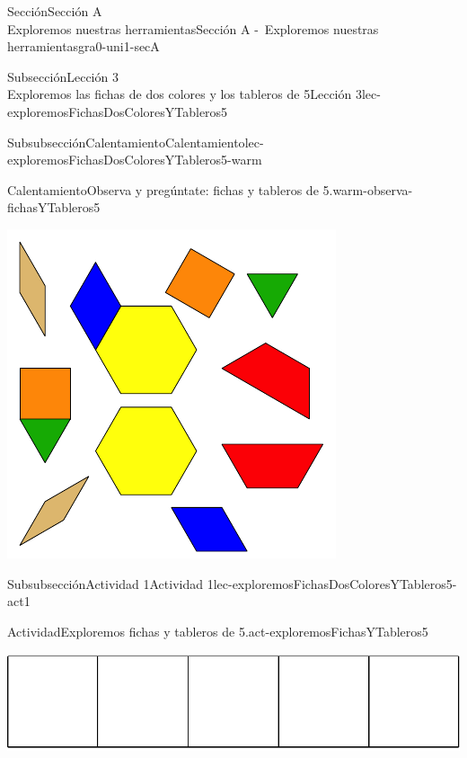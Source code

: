 \begin{sectionptx}{Sección}{{\Large Sección A\\}Exploremos nuestras herramientas}{}{Sección A -~Exploremos nuestras herramientas}{}{}{gra0-uni1-secA}
\begin{subsectionptx}{Subsección}{{\normalsize Lección 3\\[-0.05cm]}Exploremos las fichas de dos colores y los tableros de 5}{}{Lección 3}{}{}{lec-exploremosFichasDosColoresYTableros5}
\begin{subsubsectionptx}{Subsubsección}{Calentamiento}{}{Calentamiento}{}{}{lec-exploremosFichasDosColoresYTableros5-warm}
\begin{exploration}{Calentamiento}{Observa y pregúntate: fichas y tableros de 5.}{warm-observa-fichasYTableros5}
\begin{sidebyside}{2}{0.05}{0.05}{0.1}
\begin{sbspanel}{0.4}
\includegraphics[max width=\linewidth, center]{external/svg-source/tikz-file-147344.pdf}
\end{sbspanel}%
\end{sidebyside}%
\end{exploration}%
\end{subsubsectionptx}
%
%
\typeout{************************************************}
\typeout{************************************************}
%
\begin{subsubsectionptx}{Subsubsección}{Actividad 1}{}{Actividad 1}{}{}{lec-exploremosFichasDosColoresYTableros5-act1}
\begin{activity}{Actividad}{Exploremos fichas y tableros de 5.}{act-exploremosFichasYTableros5}%
\begin{image}{0}{1}{0}{}%
\includegraphics[max width=\linewidth, center]{external/svg-source/tikz-file-148144.pdf}
\end{image}%
\end{activity}%
\end{subsubsectionptx}

\end{subsectionptx}
\end{sectionptx}
